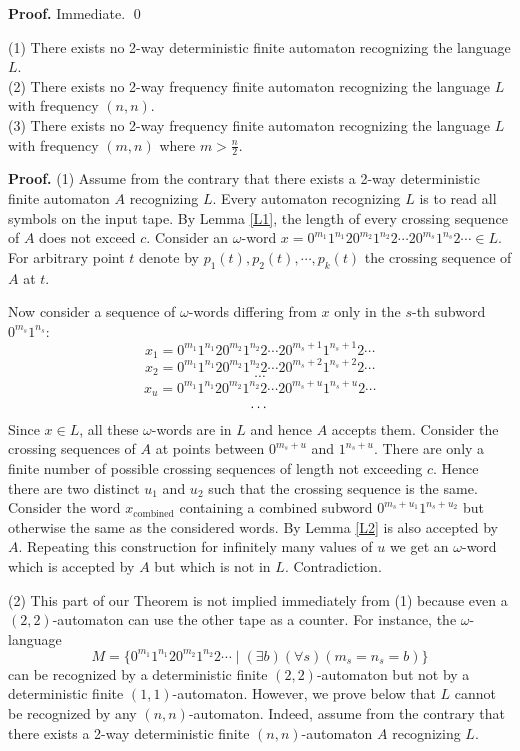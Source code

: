 \documentclass{llncs}
\begin{document}
{\bf Proof.} Immediate. \qed

\bigskip

\begin{theorem}
(1) There exists no 2-way deterministic finite automaton recognizing  the language $L$.\\
(2) There exists no 2-way frequency finite automaton recognizing  the language $L$ with frequency $(n,n)$.\\
(3) There exists no 2-way frequency finite automaton recognizing  the language $L$ with frequency $(m,n)$ where $m > \frac{n}{2}$.
\end{theorem}

{\bf Proof.} (1)  Assume from the contrary that there exists a 2-way deterministic finite
automaton $A$ recognizing $L$. 
Every automaton recognizing $L$ is to read all symbols on the input tape. By Lemma \ref{L1}, the length of every crossing sequence of $A$ does not exceed $c$. 
Consider an $\omega $-word
$x = 0^{m_1}1^{n_1}20^{m_2}1^{n_2}2\cdots 20^{m_s}1^{n_s}2\cdots \in L$. 
For arbitrary point $t$  denote by $p_1(t), p_2(t), \cdots , p_k(t)$ the crossing sequence of  $A$ at $t$. 

Now consider a sequence of $\omega$-words differing from $x$ only in the $s$-th subword $0^{m_s}1^{n_s}$:
$$
x_1 = 0^{m_1}1^{n_1}20^{m_2}1^{n_2}2\cdots 20^{m_s+1}1^{n_s+1}2\cdots 
$$
$$
x_2 = 0^{m_1}1^{n_1}20^{m_2}1^{n_2}2\cdots 20^{m_s+2}1^{n_s+2}2\cdots 
$$
$$
\cdots 
$$
$$
x_u = 0^{m_1}1^{n_1}20^{m_2}1^{n_2}2\cdots 20^{m_s+u}1^{n_s+u}2\cdots 
$$
$$
\cdots \\
$$
Since $x \in L$, all these $\omega $-words are in $L$ and hence $A$ accepts them. Consider the crossing sequences
of $A$ at points between $0^{m_s+u}$ and $1^{n_s+u}$. There are only a finite number of possible crossing sequences of length not exceeding $c$.
 Hence there are two distinct  $u_1$ and $u_2$ such that the crossing sequence is the same. Consider the word $x_{\mbox{combined}}$ containing a combined subword $0^{m_s+u_1}1^{n_s+u_2}$ but otherwise the same as the considered words. By Lemma \ref{L2} is also accepted by $A$. Repeating this construction for infinitely many values of $u$ we get an $\omega $-word which is accepted by $A$ but which is not in $L$. Contradiction.
 
\bigskip

(2) This part of our Theorem is not implied immediately from (1) because 
even a $(2,2)$-automaton can use the other tape as a counter. For instance, the $\omega $-language
$$
M = \{0^{m_1}1^{n_1}20^{m_2}1^{n_2}2\cdots \mid (\exists b)(\forall s) (m_s = n_s = b)\}
$$
can be recognized by a deterministic finite $(2,2)$-automaton but not by a deterministic finite $(1,1)$-automaton.
However, we prove below that $L$ cannot be recognized by any $(n,n)$-automaton. Indeed, 
assume from the contrary that  there exists a 2-way deterministic finite
$(n,n)$-automaton $A$ recognizing $L$. 
 
\end{document}
